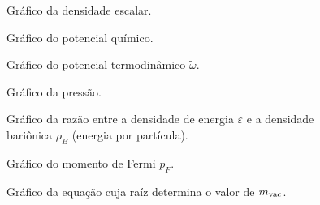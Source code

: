 \begin{figure}
	
	\caption{Gráfico da densidade escalar. \protect}
	\label{Fig:scalar_density_NJL-Buballa_Set_1}
\end{figure}

\begin{figure}
	
	\caption{Gráfico do potencial químico. \protect}
	\label{Fig:chemical_potential_NJL-Buballa_Set_1}
\end{figure}

\begin{figure}
	
	\caption{Gráfico do potencial termodinâmico $\tilde{\omega}$. \protect}
	\label{Fig:thermodynamic_potential_NJL-Buballa_Set_1}
\end{figure}

\begin{figure}
	
	\caption{Gráfico da pressão. \protect}
	\label{Fig:pressure_NJL-Buballa_Set_1}
\end{figure}

\begin{figure}
	
	\caption{Gráfico da razão entre a densidade de energia $\varepsilon$ e a densidade bariônica $\rho_B$ (energia por partícula). \protect}
	\label{Fig:energy_density_per_particle_NJL-Buballa_Set_1}
\end{figure}

\FloatBarrier


\begin{figure}
	
	\caption{Gráfico do momento de Fermi $p_F$. \protect}
	\label{Fig:fermi_momentum_NJL-D_1}
\end{figure}

\begin{figure}
	
	\caption{Gráfico da equação cuja raíz determina o valor de $m_{\rm{vac}}$. \protect}
	\label{Fig:vacuum_mass_equation_NJL-D_1}
\end{figure}

